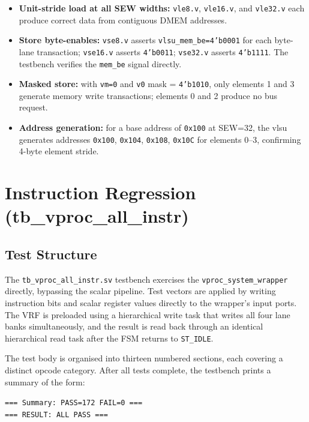 \begin{itemize}
  \item \textbf{Unit-stride load at all SEW widths:} \texttt{vle8.v}, \texttt{vle16.v},
        and \texttt{vle32.v} each produce correct data from contiguous DMEM addresses.
  \item \textbf{Store byte-enables:} \texttt{vse8.v} asserts \texttt{vlsu\_mem\_be=4'b0001}
        for each byte-lane transaction; \texttt{vse16.v} asserts \texttt{4'b0011};
        \texttt{vse32.v} asserts \texttt{4'b1111}. The testbench verifies the
        \texttt{mem\_be} signal directly.
  \item \textbf{Masked store:} with \texttt{vm=0} and \texttt{v0} mask = \texttt{4'b1010},
        only elements 1 and 3 generate memory write transactions; elements 0 and 2
        produce no bus request.
  \item \textbf{Address generation:} for a base address of \texttt{0x100} at SEW=32,
        the \gls{vlsu} generates addresses \texttt{0x100}, \texttt{0x104}, \texttt{0x108},
        \texttt{0x10C} for elements 0--3, confirming 4-byte element stride.
\end{itemize}

\section{Instruction Regression (tb\_vproc\_all\_instr)}
\label{sec:regression}

\subsection{Test Structure}

The \texttt{tb\_vproc\_all\_instr.sv} testbench exercises the
\texttt{vproc\_system\_wrapper} directly, bypassing the scalar pipeline. Test vectors
are applied by writing instruction bits and scalar register values directly to the
wrapper's input ports. The VRF is preloaded using a hierarchical write task that
writes all four lane banks simultaneously, and the result is read back through an
identical hierarchical read task after the FSM returns to \texttt{ST\_IDLE}.

The test body is organised into thirteen numbered sections, each covering a distinct
opcode category. After all tests complete, the testbench prints a summary of the form:

\begin{center}
\texttt{=== Summary: PASS=172  FAIL=0 ===}\\
\texttt{=== RESULT: ALL PASS ===}
\end{center}

